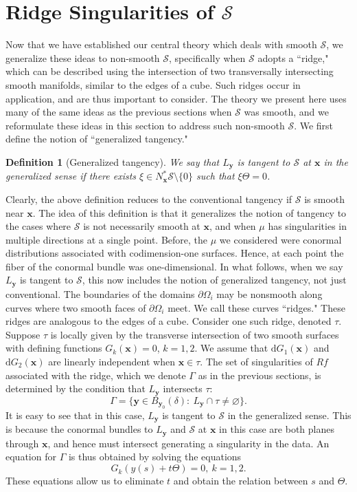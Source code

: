 \documentclass[11pt]{article}
\newcommand{\jc}[1]{\begin{quotation}\textbf{James' comment:\
}{\textit{#1}}\end{quotation}}
\newcommand{\be}{\begin{equation}}
\newcommand{\ee}{\end{equation}}
\newcommand{\s}{\mathcal S}
\newcommand{\ed}{\tau}
\newcommand{\pa}{\partial}
\newcommand{\dd}{\mathrm{d}}
\numberwithin{equation}{section}
\newcommand{\vy}{\mathbf{y}}
\newcommand{\vx}{\mathbf{x}}
\newtheorem{definition}[theorem]{Definition}
\theoremstyle{definition}
\begin{document}
\section{Ridge Singularities of $\s$}\label{sec:folds}

Now that we have established our central theory which deals with smooth $\s$, we generalize these ideas to non-smooth $\s$, specifically when $\s$ adopts a ``ridge," which can be described using the intersection of two transversally intersecting smooth manifolds, similar to the edges of a cube. Such ridges occur in application, and are thus important to consider. The theory we present here uses many of the same ideas as the previous sections when $\s$ was smooth, and we reformulate these ideas in this section to address such non-smooth $\s$. We first define the notion of ``generalized tangency."

\begin{definition}[Generalized tangency] \label{def:gen tan} We say that $L_{\vy}$ is tangent to $\s$ at $\vx$ in the generalized sense if there exists $\xi\in N_{\vx}^*\s\setminus\{0\}$ such that $\xi\Theta=0$. 
\end{definition}

Clearly, the above definition reduces to the conventional tangency if $\s$ is smooth near $\vx$. The idea of this definition is that it generalizes the notion of tangency to the cases where $\s$ is not necessarily smooth at $\vx$, and when $\mu$ has singularities in multiple directions at a single point. Before, the $\mu$ we considered were conormal distributions associated with codimension-one surfaces. Hence, at each point the fiber of the conormal bundle was one-dimensional. In what follows, 
{when we say $L_\vy$ is tangent to $\s$, this now includes the notion of generalized tangency, not just conventional.} The boundaries of the domains $\pa\Omega_i$ may be nonsmooth along curves where two smooth faces of $\pa\Omega_i$ meet. We call these curves ``ridges." These ridges are analogous to the edges of a cube. Consider one such ridge, denoted $\ed$. Suppose $\tau$ is locally given by the transverse intersection of two smooth surfaces with defining functions $G_k(\vx)=0$, $k=1,2$. We assume that $\dd G_1(\vx)$ and $\dd G_2(\vx)$ are linearly independent when $\vx\in\ed$. The set of singularities of $Rf$ associated with the ridge, which we denote $\Gamma$ as in the previous sections, is determined by the condition that $L_{\vy}$ intersects $\ed$: 
\be\label{Ga def edge}
\Gamma=\{\vy\in B_{\vy_0}(\delta):\ L_{\vy}\cap\ed\neq\varnothing\}.
\ee
It is easy to see that in this case, $L_{\vy}$ is tangent to $\s$ in the generalized sense. This is because the {conormal} bundles to $L_\vy$ and $\s$ at $\vx$ in this case are both planes through $\vx$, and hence must intersect generating a singularity in the data. An equation for $\Gamma$ is thus obtained by solving the equations
\be\label{edge rt}
G_k(y(s)+t\Theta)=0,\ k=1,2.
\ee
These equations allow us to eliminate $t$ and obtain the relation between $s$ and $\Theta$.
\end{document}

